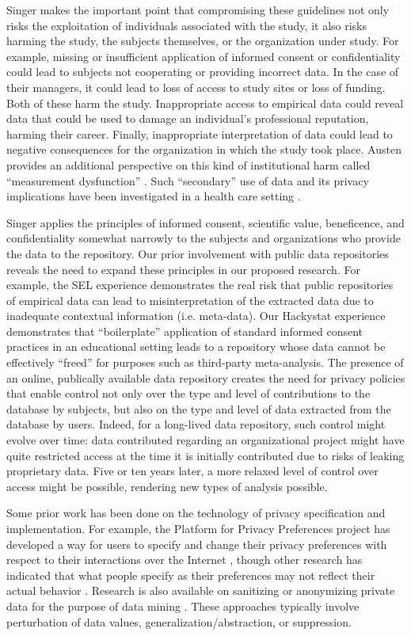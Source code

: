 Singer makes the important point that compromising these guidelines not
only risks the exploitation of individuals associated with the study, it
also risks harming the study, the subjects themselves, or the organization
under study.  For example, missing or insufficient application of informed
consent or confidentiality could lead to subjects not cooperating or
providing incorrect data.  In the case of their managers, it could lead to
loss of access to study sites or loss of funding. Both of these harm the
study.  Inappropriate access to empirical data could reveal data that could
be used to damage an individual's professional reputation, harming their
career. Finally, inappropriate interpretation of data could lead to
negative consequences for the organization in which the study took place.
Austen provides an additional perspective on this kind of institutional
harm called ``measurement dysfunction'' \cite{Austen96}.  Such ``secondary''
use of data and its privacy implications have been investigated in a health
care setting \cite{Lowrance03}.

Singer applies the principles of informed consent, scientific value,
beneficence, and confidentiality somewhat narrowly to the subjects and
organizations who provide the data to the repository.  Our prior
involvement with public data repositories reveals the need to expand these
principles in our proposed research.  For example, the SEL experience
demonstrates the real risk that public repositories of empirical data can
lead to misinterpretation of the extracted data due to inadequate
contextual information (i.e. meta-data). Our Hackystat experience
demonstrates that ``boilerplate'' application of standard informed consent
practices in an educational setting leads to a repository whose data cannot
be effectively ``freed'' for purposes such as third-party meta-analysis.
The presence of an online, publically available data repository creates the
need for privacy policies that enable control not only over the type and
level of contributions to the database by subjects, but also on the type
and level of data extracted from the database by users.  Indeed, for a
long-lived data repository, such control might evolve over time: data
contributed regarding an organizational project might have quite restricted
access at the time it is initially contributed due to risks of leaking
proprietary data.  Five or ten years later, a more relaxed level of control
over access might be possible, rendering new types of analysis possible.  

Some prior work has been done on the technology of privacy specification
and implementation. For example, the Platform for Privacy Preferences
project has developed a way for users to specify and change their privacy
preferences with respect to their interactions over the Internet
\cite{Cranor03}, though other research has indicated that what people
specify as their preferences may not reflect their actual behavior
\cite{Spiekermann01}. Research is also available on sanitizing or
anonymizing private data for the purpose of data mining \cite{Rizvi02,
Iyengar02}. These approaches typically involve perturbation of data values,
generalization/abstraction, or suppression.  

